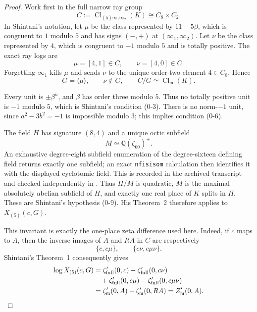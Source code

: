 \documentclass[11pt]{article}
\newcommand{\Cl}{\operatorname{Cl}}
\newcommand{\Q}{\mathbb Q}
\begin{document}
\begin{proof}
Work first in the full narrow ray group
\[
 C:=\Cl_{(5)\infty_1\infty_2}(K)\cong C_8\times C_2.
\]
In Shintani's notation, let $\mu$ be the class represented by
$11-5\beta$, which is congruent to $1$ modulo $5$ and has signs
$(-,+)$ at $(\infty_1,\infty_2)$.  Let $\nu$ be the class represented
by $4$, which is congruent to $-1$ modulo $5$ and is totally positive.
The exact ray logs are
\[
 \mu=[4,1]\in C,\qquad \nu=[4,0]\in C.
\]
Forgetting $\infty_1$ kills $\mu$ and sends $\nu$ to the unique
order-two element $4\in C_8$.  Hence
\[
 G=\langle\mu\rangle,\qquad \nu\notin G,\qquad
 C/G\simeq\Cl_{\mathfrak m}(K).
\]

Every unit is $\pm\beta^n$, and $\beta$ has order three modulo $5$.
Thus no totally positive unit is $-1$ modulo $5$, which is Shintani's
condition (0-3).  There is no norm-$-1$ unit, since
$a^2-3b^2=-1$ is impossible modulo $3$; this implies condition (0-6).

The field $H$ has signature $(8,4)$ and a unique octic subfield
\[
 M\simeq\Q(\zeta_{60})^+.
\]
An exhaustive degree-eight subfield enumeration of the degree-sixteen
defining field returns exactly one subfield; an exact
\texttt{nfisisom} calculation then identifies it with the displayed
cyclotomic field.  This is recorded in the archived
 transcript and checked
independently in
.
Thus $H/M$ is quadratic, $M$ is the maximal absolutely abelian
subfield of $H$, and exactly one real place of $K$ splits in $H$.
These are Shintani's hypothesis (0-9).  His Theorem~2
\cite{Shintani1978} therefore applies to $X_{(5)}(c,G)$.

This invariant is exactly the one-place zeta difference used here.
Indeed, if $c$ maps to $A$, then the inverse images of $A$ and
$RA$ in $C$ are respectively
\[
 \{c,c\mu\},\qquad \{c\nu,c\mu\nu\}.
\]
Shintani's Theorem~1 consequently gives
\[
\begin{aligned}
\log X_{(5)}(c,G)
&=\zeta'_{\rm full}(0,c)-\zeta'_{\rm full}(0,c\nu)\\
&\quad+\zeta'_{\rm full}(0,c\mu)
       -\zeta'_{\rm full}(0,c\mu\nu)\\
&=\zeta'_{\mathfrak m}(0,A)-\zeta'_{\mathfrak m}(0,RA)
=Z'_{\mathfrak m}(0,A).
\end{aligned}
\]


\end{proof}
\end{document}
